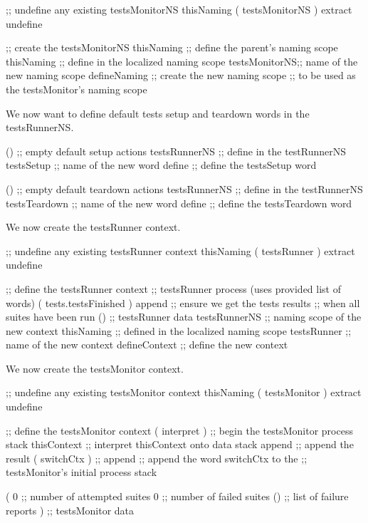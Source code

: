 \startJoylolCode
  ;; undefine any existing testsMonitorNS
  thisNaming
  ( testsMonitorNS ) extract
  undefine
  
  ;; create the testsMonitorNS
  thisNaming    ;; define the parent's naming scope
  thisNaming    ;; define in the localized naming scope
  testsMonitorNS;; name of the new naming scope
  defineNaming  ;; create the new naming scope
                ;; to be used as the testsMonitor's naming scope
\stopJoylolCode

We now want to define default tests setup and teardown words in the 
testsRunnerNS. 

\startJoylolCode
  ()            ;; empty default setup actions
  testsRunnerNS ;; define in the testRunnerNS
  testsSetup    ;; name of the new word
  define        ;; define the testsSetup word
\stopJoylolCode

\startJoylolCode
  ()            ;; empty default teardown actions
  testsRunnerNS ;; define in the testRunnerNS
  testsTeardown ;; name of the new word
  define        ;; define the testsTeardown word
\stopJoylolCode

We now create the testsRunner context.

\startJoylolCode
  ;; undefine any existing testsRunner context
  thisNaming
  ( testsRunner ) extract
  undefine

  ;; define the testsRunner context
                ;; testsRunner process (uses provided list of words)
  ( tests.testsFinished )
  append        ;; ensure we get the tests results
                ;; when all suites have been run
  ()            ;; testsRunner data
  testsRunnerNS ;; naming scope of the new context
  thisNaming    ;; defined in the localized naming scope
  testsRunner   ;; name of the new context
  defineContext ;; define the new context
\stopJoylolCode

We now create the testsMonitor context.

\startJoylolCode
  ;; undefine any existing testsMonitor context
  thisNaming
  ( testsMonitor ) extract
  undefine

  ;; define the testsMonitor context
  ( interpret )   ;; begin the testsMonitor process stack
  thisContext     ;; interpret thisContext onto data stack
  append          ;; append the result
  ( switchCtx )   ;;
  append          ;; append the word switchCtx to the
                  ;; testsMonitor's initial process stack
  
  (
    0             ;; number of attempted suites
    0             ;; number of failed suites
    ()            ;; list of failure reports
  )               ;; testsMonitor data
  
